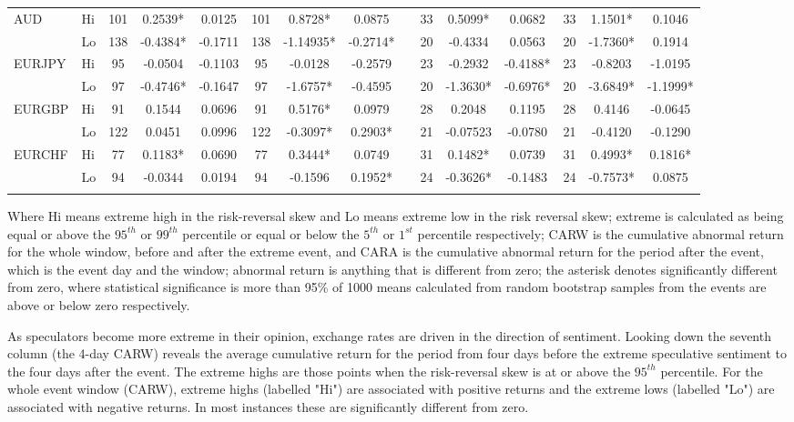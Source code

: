 \documentclass{article}
\begin{document}
\begin{table}
\begin{threeparttable}
\begin{tabular}{llccccccccccccc}
\multirow{2}{*}{AUD}
& Hi & 101 &0.2539* &0.0125 &101 &0.8728* & 0.0875 &  &33 &0.5099* &0.0682 &33 & 1.1501*& 0.1046  \\ 
& Lo & 138 &-0.4384* & -0.1711 & 138 & -1.14935* & -0.2714* & &20 &-0.4334 & 0.0563 &20  & -1.7360* & 0.1914  \\
\multirow{2}{*}{EURJPY}
& Hi & 95 &-0.0504 &-0.1103 &95 &-0.0128 &-0.2579 & &23 &-0.2932 &-0.4188* &23 &-0.8203 & -1.0195  \\ 
& Lo & 97 &-0.4746* & -0.1647 &97 &-1.6757* &-0.4595 & &20 &-1.3630* & -0.6976* & 20 & -3.6849* &-1.1999*  \\
\multirow{2}{*}{EURGBP}
& Hi & 91 & 0.1544 &0.0696 &91 &0.5176* &0.0979 & &28 &0.2048 &0.1195 &28 & 0.4146 & -0.0645  \\ 
& Lo & 122 & 0.0451 & 0.0996 &122 &-0.3097* &0.2903* & & 21 &-0.07523 &-0.0780 &21 & -0.4120 &
-0.1290  \\
\multirow{2}{*}{EURCHF}
& Hi & 77 & 0.1183* & 0.0690 &77 & 0.3444* & 0.0749& & 	31 & 0.1482* &0.0739  &31 & 0.4993* 
& 0.1816*  \\ 
& Lo & 94 &-0.0344 & 0.0194 & 94 & -0.1596 &0.1952* & &24 & -0.3626* &-0.1483 & 24 & -0.7573* 
& 0.0875  \\
\hline
\label{tabref:RR1}
\end{tabular}
\begin{tablenotes}
\small 
\item Where Hi means extreme high in the risk-reversal skew and Lo means extreme low in the risk reversal skew; extreme is calculated as being equal or above the $95^{th}$ or $99^{th}$ percentile or equal or below the $5^{th}$ or $1^{st}$ percentile respectively; CARW is the cumulative abnormal return for the whole window, before and after the extreme event, and CARA is the cumulative abnormal return for the period after the event, which is the event day and the window; abnormal return is anything that is different from zero; the asterisk denotes significantly different from zero, where statistical significance is more than 95\% of 1000 means calculated from random bootstrap samples from the events are above or below zero respectively.   
\end{tablenotes}
\end{threeparttable}  
\end{table}

As speculators become more extreme in their opinion, exchange rates are driven in the direction of sentiment. Looking down the seventh column (the 4-day CARW) reveals the average cumulative return for the period from four days before the extreme speculative sentiment to the four days after the event.   The extreme highs are those points when the risk-reversal skew is at or above the $95^{th}$ percentile.  For the whole event window (CARW), extreme highs (labelled "Hi") are associated with positive returns and the extreme lows (labelled "Lo") are associated with negative returns. In most instances these are significantly different from zero.  
\end{document}
